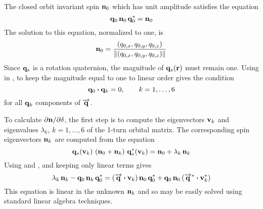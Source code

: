 The closed orbit invariant spin ${\bf n}_0$ which has unit amplitude satisfies the equation
\begin{equation}
  {\bf q}_0 \, {\bf n}_0 \, {\bf q}_0^* = {\bf n}_0
  \label{qnqn}
\end{equation}
The solution to this equation, normalized to one, is
\begin{equation}
  {\bf n}_0 = \frac{(q_{0,x}, q_{0,y}, q_{0,z})}{\|(q_{0,x}, q_{0,y}, q_{0,z})\|}
  \label{nkqqq}
\end{equation}
Since ${\bf q}_s$ is a rotation quaternion, the magnitude of ${\bf q}_s({\bf r})$ must remain one. Using
 in , to keep the magnitude equal to one to linear order gives the condition
\begin{equation}
  {\bf q}_0 \mathbin{\boldsymbol{\cdot}} {\bf q}_k = 0, \qquad k = 1, \ldots, 6
\end{equation}
for all ${\bf q}_k$ components of $\overrightarrow{{\bf q}}$.

To calculate $\partial{\bf n}/\partial\delta$, the first step is to compute the eigenvectors ${\bf v}_k$ and
eigenvalues $\lambda_k$, $k = 1, \ldots, 6$ of the 1-turn orbital matrix. The
corresponding spin eigenvectors ${\bf n}_k$ are computed from the equation
\begin{equation}
  {\bf q}_s({\bf v}_k) \,\, ({\bf n}_0 + {\bf n}_k) \,\, {\bf q}_s^*({\bf v}_k) = {\bf n}_0 + \lambda_k \, {\bf n}_k
  \label{qnnq}
\end{equation}
Using  and , and keeping only linear terms gives
\begin{equation}
  \lambda_k \, {\bf n}_k - {\bf q}_0 \, {\bf n}_k \, {\bf q}_0^* = 
  (\overrightarrow{{\bf q}} \mathbin{\boldsymbol{\cdot}} {\bf v}_k) \, {\bf n}_0 \, {\bf q}_0^* + 
  {\bf q}_0 \, {\bf n}_0 \, (\overrightarrow{{\bf q}}^* \mathbin{\boldsymbol{\cdot}} {\bf v}_k^*)
  \label{lnqnq}
\end{equation}
This equation is linear in the unknown ${\bf n}_k$ and so may be easily solved using standard linear
algebra techniques.

